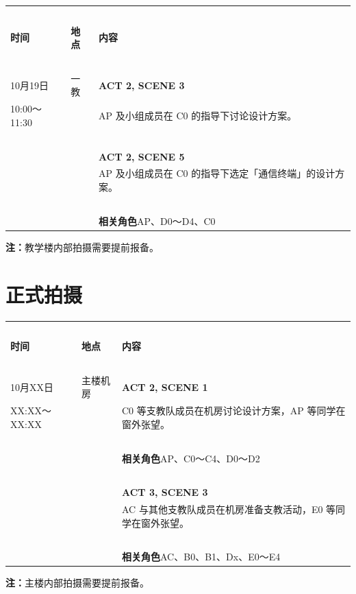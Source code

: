 \documentclass[10pt, a5paper, oneside]{memoir}
\begin{document}
\begin{table}[!ht]
	\raggedright
	\begin{tabular}{p{}p{}p{}}
		\toprule
		~ & & \\[-0.7em]
		\textbf{时间} & \textbf{地点} & \textbf{内容} \\[0.3em]
		\midrule
		~ & & \\[-0.7em]
		10月19日        & 一教 & \textbf{ACT 2, SCENE 3} \\[0.3em]
		10:00～11:30     & ~ & 
			AP 及小组成员在 C0 的指导下讨论设计方案。 
		\\
		~ & & \\[-0.7em]
		~ & ~ & \textbf{ACT 2, SCENE 5} \\[0.3em]
		~ & ~ & 
			AP 及小组成员在 C0 的指导下选定「通信终端」的设计方案。 
		\\
		~ & & \\[-0.7em]
		~ & ~ & \textbf{相关角色\quad}AP、D0～D4、C0 \\[0.3em]
		\bottomrule
	\end{tabular}
\end{table}
{   \vspace{-0.7\baselineskip}
	\kai \small
	\textbf{注：}教学楼内部拍摄需要提前报备。
}

\clearpage

\section*{正式拍摄}

\begin{table}[!ht]
	\raggedright
	\begin{tabular}{p{}p{}p{}}
		\toprule
		~ & & \\[-0.7em]
		\textbf{时间} & \textbf{地点} & \textbf{内容} \\[0.3em]
		\midrule
		~ & & \\[-0.7em]
		10月XX日        & 主楼机房 & \textbf{ACT 2, SCENE 1} \\[0.3em]
		XX:XX～XX:XX    & ~ & 
			C0 等支教队成员在机房讨论设计方案，AP 等同学在窗外张望。 
		\\
		~ & & \\[-0.7em]
		~ & ~ & \textbf{相关角色\quad}AP、C0～C4、D0～D2 \\[0.3em]
		~ & & \\[-0.7em]
		~ & ~ & \textbf{ACT 3, SCENE 3} \\[0.3em]
		~ & ~ & 
			AC 与其他支教队成员在机房准备支教活动，E0 等同学在窗外张望。
		\\
		~ & & \\[-0.7em]
		~ & ~ & \textbf{相关角色\quad}AC、B0、B1、Dx、E0～E4 \\[0.3em]
		\bottomrule
	\end{tabular}
\end{table}
{   \vspace{-0.7\baselineskip}
	\kai \small
	\textbf{注：}主楼内部拍摄需要提前报备。
}
\end{document}
